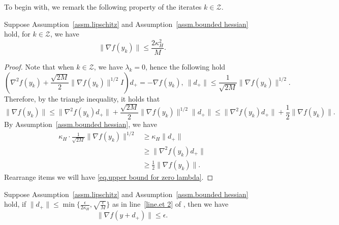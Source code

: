 \documentclass{mcom-l}
\numberwithin{equation}{section}
\begin{document}
To begin with, we remark the following property of the iterates $k\in\mathcal{Z}$.
\begin{lemma}
    \label{lem.upper bound for zero lambda}
    Suppose Assumption~\ref{assm.lipschitz} and Assumption~\ref{assm.bounded hessian} hold, for $k\in \mathcal{Z}$, we have
    \begin{equation}
        \label{eq.upper bound for zero lambda}
        \|\nabla f(y_k)\|\leq \frac{2\kappa_H^2}{M}.
    \end{equation}
\end{lemma}
\begin{proof}
    Note that when $k\in \mathcal{Z}$, we have $\lambda_k =0$, hence the following hold
    \begin{equation*}
        \left (\nabla^2 f(y_k)+\frac{\sqrt{2M}}{2}\|\nabla f(y_k)\|^{1/2} I\right )d_+ = -\nabla f(y_k), \ \|d_+\| \leq \frac{1}{\sqrt{2M}}\|\nabla f(y_k)\|^{1/2}.
    \end{equation*}
    Therefore, by the triangle inequality, it holds that
    \begin{equation*}
        \|\nabla f(y_k)\| \leq \|\nabla^2 f(y_k) d_+\| +\frac{\sqrt{2M}}{2}\|\nabla f(y_k)\|^{1/2}\|d_+\| \leq \|\nabla^2 f(y_k) d_+\|+\frac{1}{2}\|\nabla f(y_k)\|.
    \end{equation*}
    By Assumption~\ref{assm.bounded hessian}, we have
    \begin{equation*}
        \begin{aligned}
            \kappa_H \cdot \frac{1}{\sqrt{2M}}\|\nabla f(y_k)\|^{1/2} & \geq \kappa_H \|d_+\|              \\
                                                                      & \geq \|\nabla^2 f(y_k) d_+\|       \\
                                                                      & \geq \frac{1}{2}\|\nabla f(y_k)\|.
        \end{aligned}
    \end{equation*}
    Rearrange items we will have \eqref{eq.upper bound for zero lambda}.
\end{proof}
\begin{corollary}
    \label{coro.second et}
    Suppose Assumption~\ref{assm.lipschitz} and Assumption~\ref{assm.bounded hessian} hold, if $\|d_+\|\leq \min\{\frac{\epsilon}{2\kappa_H},\sqrt{\frac{\epsilon}{M}}\}$ as in line~\ref{line.et 2} of , then we have
    \begin{equation*}
        \|\nabla f(y+d_+)\|\leq \epsilon.
    \end{equation*}
\end{corollary}
\end{document}
